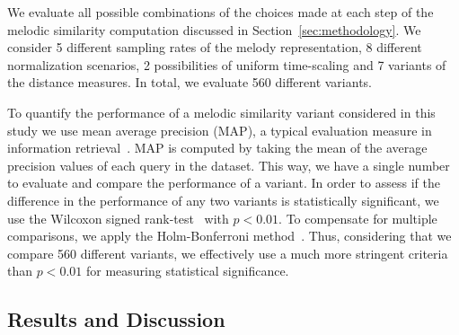 
We evaluate all possible combinations of the choices made at each step of the melodic similarity computation discussed in Section~\ref{sec:methodology}. We consider 5 different sampling rates of the melody representation, 8 different normalization scenarios, 2 possibilities of uniform time-scaling and 7 variants of the distance measures. In total, we evaluate 560 different variants.

To quantify the performance of a melodic similarity variant considered in this study we use mean average precision (MAP), a typical evaluation measure in information retrieval~\citep{manning2008introduction}. MAP is computed by taking the mean of the average precision values of each query in the dataset. This way, we have a single number to evaluate and compare the performance of a variant. In order to assess if the difference in the performance of any two variants is statistically significant, we use the Wilcoxon signed rank-test~\citep{wilcoxon1945individual} with $p < 0.01$. To compensate for multiple comparisons, we apply the Holm-Bonferroni method~\citep{holm1979simple}. Thus, considering that we compare 560 different variants, we effectively use a much more stringent criteria than $p < 0.01$ for measuring statistical significance.


\subsection{Results and Discussion}
\label{sec:patterns_melodic_similarity_results_discussions}


